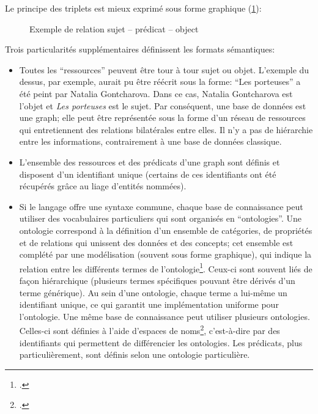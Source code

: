 Le principe des triplets \rdf{} est mieux exprimé sous forme graphique (\ref{fig:triplet}):

\begin{figure}[!h]
	\centering
	\caption{Exemple de relation sujet -- prédicat -- object}
	\label{fig:triplet}
\end{figure}

Trois particularités supplémentaires définissent les formats sémantiques:
\begin{itemize}
	\item Toutes les \enquote{ressources} peuvent être tour à tour sujet ou objet. L'exemple du dessus, par exemple, aurait pu être réécrit sous la forme: \enquote{Les porteuses} a été peint par Natalia Gontcharova. Dans ce cas, Natalia Gontcharova est l'objet et \textit{Les porteuses} est le sujet. Par conséquent, une base de données \rdf{} est une \gls{graph}; elle peut être représentée sous la forme d'un réseau de ressources qui entretiennent des relations bilatérales entre elles. Il n'y a pas de hiérarchie entre les informations, contrairement à une base de données \xml{} classique.
	\item L'ensemble des ressources et des prédicats d'une \gls{graph} sont définis et disposent d'un identifiant unique (certains de ces identifiants ont été récupérés grâce au liage d'entités nommées).
	\item Si le langage \sparql{} offre une syntaxe commune, chaque base de connaissance peut utiliser des vocabulaires particuliers qui sont organisés en \enquote{ontologies}. Une ontologie correspond à la définition d'un ensemble de catégories, de propriétés et de relations qui unissent des données et des concepts; cet ensemble est complété par une modélisation (souvent sous forme graphique), qui indique la relation entre les différents termes de l'ontologie\footcite{noauthor_ontology_2022}. Ceux-ci sont souvent liés de façon hiérarchique (plusieurs termes spécifiques pouvant être dérivés d'un terme générique). Au sein d'une ontologie, chaque terme a lui-même un identifiant unique, ce qui garantit une implémentation uniforme pour l'ontologie. Une même base de connaissance peut utiliser plusieurs ontologies. Celles-ci sont définies à l'aide d'espaces de noms\footcite{noauthor_namespace_2022}, c'est-à-dire par des identifiants qui permettent de différencier les ontologies. Les prédicats, plus particulièrement, sont définis selon une ontologie particulière.
\end{itemize}

